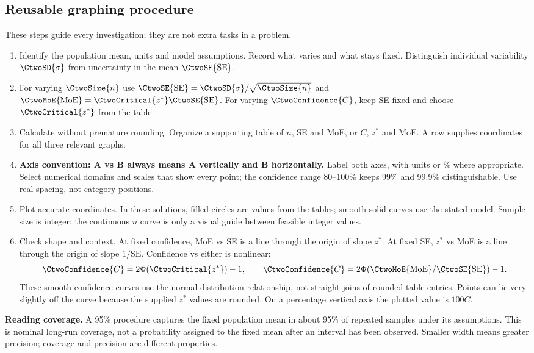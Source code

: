 \subsection{Reusable graphing procedure}
These steps guide every investigation; they are not extra tasks in a problem.
\begin{enumerate}[leftmargin=*,itemsep=7pt]
\item Identify the population mean, units and model assumptions. Record what varies and what stays fixed. Distinguish individual variability $\CtwoSD{\sigma}$ from uncertainty in the mean $\CtwoSE{\mathrm{SE}}$.
\item For varying $\CtwoSize{n}$ use $\CtwoSE{\mathrm{SE}}=\CtwoSD{\sigma}/\sqrt{\CtwoSize{n}}$ and $\CtwoMoE{\mathrm{MoE}}=\CtwoCritical{z^*}\CtwoSE{\mathrm{SE}}$. For varying $\CtwoConfidence{C}$, keep SE fixed and choose $\CtwoCritical{z^*}$ from the table.
\item Calculate without premature rounding. Organize a supporting table of $n$, SE and MoE, or $C$, $z^*$ and MoE. A row supplies coordinates for all three relevant graphs.
\item \textbf{Axis convention: A vs B always means A vertically and B horizontally.} Label both axes, with units or \% where appropriate. Select numerical domains and scales that show every point; the confidence range 80--100\% keeps 99\% and 99.9\% distinguishable. Use real spacing, not category positions.
\item Plot accurate coordinates. In these solutions, filled circles are values from the tables; smooth solid curves use the stated model. Sample size is integer: the continuous $n$ curve is only a visual guide between feasible integer values.
\item Check shape and context. At fixed confidence, MoE vs SE is a line through the origin of slope $z^*$. At fixed SE, $z^*$ vs MoE is a line through the origin of slope $1/\mathrm{SE}$. Confidence vs either is nonlinear:
\[
\CtwoConfidence{C}=2\Phi(\CtwoCritical{z^*})-1,
\qquad \CtwoConfidence{C}=2\Phi(\CtwoMoE{\mathrm{MoE}}/\CtwoSE{\mathrm{SE}})-1.
\]
These smooth confidence curves use the normal-distribution relationship, not straight joins of rounded table entries. Points can lie very slightly off the curve because the supplied $z^*$ values are rounded. On a percentage vertical axis the plotted value is $100C$.
\end{enumerate}
\textbf{Reading coverage.} A 95\% procedure captures the fixed population mean in about 95\% of repeated samples under its assumptions. This is nominal long-run coverage, not a probability assigned to the fixed mean after an interval has been observed. Smaller width means greater precision; coverage and precision are different properties.
\clearpage
